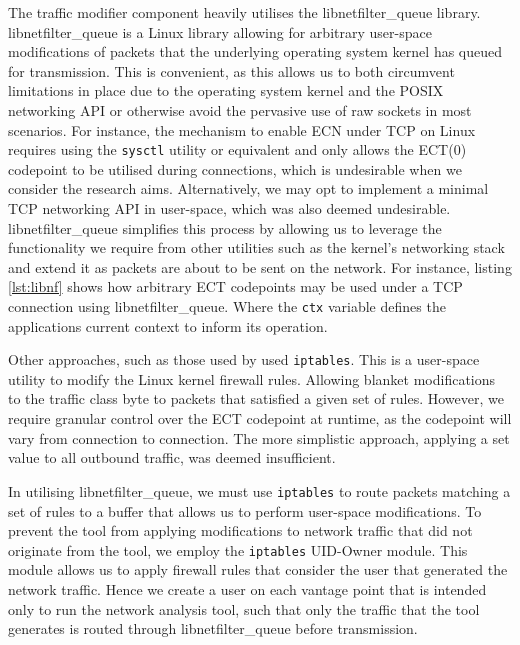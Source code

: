 \documentclass{l4proj}
\begin{document}
The traffic modifier component heavily utilises the libnetfilter\_queue library. libnetfilter\_queue is a Linux library allowing for arbitrary user-space modifications of packets that the underlying operating system kernel has queued for transmission. This is convenient, as this allows us to both circumvent limitations in place due to the operating system kernel and the POSIX networking API or otherwise avoid the pervasive use of raw sockets in most scenarios. For instance, the mechanism to enable ECN under TCP on Linux requires using the \lstinline{sysctl} utility or equivalent and only allows the ECT(0) codepoint to be utilised during connections, which is undesirable when we consider the research aims. Alternatively, we may opt to implement a minimal TCP networking API in user-space, which was also deemed undesirable. libnetfilter\_queue simplifies this process by allowing us to leverage the functionality we require from other utilities such as the kernel's networking stack and extend it as packets are about to be sent on the network. For instance, listing \ref{lst:libnf} shows how arbitrary ECT codepoints may be used under a TCP connection using libnetfilter\_queue. Where the \lstinline{ctx} variable defines the applications current context to inform its operation.

Other approaches, such as those used by \cite{bauer_measuring_2011} used \lstinline{iptables}. This is a user-space utility to modify the Linux kernel firewall rules. Allowing blanket modifications to the traffic class byte to packets that satisfied a given set of rules. However, we require granular control over the ECT codepoint at runtime, as the codepoint will vary from connection to connection. The more simplistic approach, applying a set value to all outbound traffic, was deemed insufficient.

In utilising libnetfilter\_queue, we must use \lstinline{iptables} to route packets matching a set of rules to a buffer that allows us to perform user-space modifications. To prevent the tool from applying modifications to network traffic that did not originate from the tool, we employ the \lstinline{iptables} UID-Owner module. This module allows us to apply firewall rules that consider the user that generated the network traffic. Hence we create a user on each vantage point that is intended only to run the network analysis tool, such that only the traffic that the tool generates is routed through libnetfilter\_queue before transmission.
\end{document}
